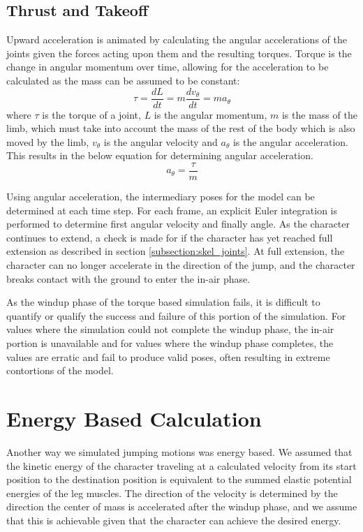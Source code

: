 \subsection{Thrust and Takeoff}
\label{subsection:thrust}
Upward acceleration is animated by calculating the angular accelerations of the joints given the forces acting upon them and the resulting torques.  Torque is the change in angular momentum over time, allowing for the acceleration to be calculated as the mass can be assumed to be constant: \[\tau = \dfrac{dL}{dt} = m \dfrac{dv_{\theta}}{dt} = m a_{\theta}\] where $\tau$ is the torque of a joint, $L$ is the angular momentum, $m$ is the mass of the limb, which must take into account the mass of the rest of the body which is also moved by the limb, $v_{\theta}$ is the angular velocity and $a_{\theta}$ is the angular acceleration. This results in the below equation for determining angular acceleration. \[a_{\theta} = \dfrac{\tau}{m}\]

Using angular acceleration, the intermediary poses for the model can be determined at each time step.   For each frame, an explicit Euler integration is performed to determine first angular velocity and finally angle.  As the character continues to extend, a check is made for if the character has yet reached full extension as described in section \ref{subsection:skel_joints}.  At full extension, the character can no longer accelerate in the direction of the jump, and the character breaks contact with the ground to enter the in-air phase.

As the windup phase of the torque based simulation fails, it is difficult to quantify or qualify the success and failure of this portion of the simulation.  For values where the simulation could not complete the windup phase, the in-air portion is unavailable and for values where the windup phase completes, the values are erratic and fail to produce valid poses, often resulting in extreme contortions of the model.


\section{Energy Based Calculation}
Another way we simulated jumping motions was energy based.  We assumed that the kinetic energy of the character traveling at a calculated velocity from its start position to the destination position is equivalent to the summed elastic potential energies of the leg muscles.  The direction of the velocity is determined by the direction the center of mass is accelerated after the windup phase, and we assume that this is achievable given that the character can achieve the desired energy.  


